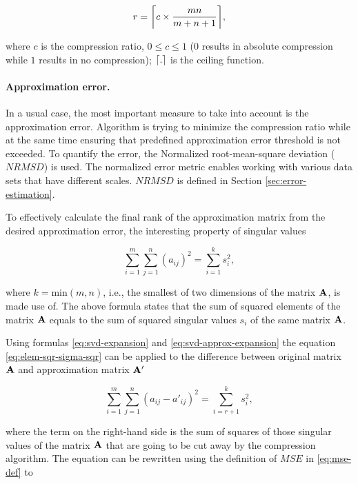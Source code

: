 \begin{equation}
r=\ceil*{c \times \frac{m n}{m+n+1}},
\label{eq:rank-from-comp-ratio}
\end{equation}

\noindent
where $c$ is the compression ratio, $0 \leq c \leq 1$ ($0$ results in absolute compression while $1$ results in no compression); $\ceil*{.}$ is the ceiling function.

\paragraph{Approximation error.}
In a usual case, the most important measure to take into account is the approximation error. Algorithm is trying to minimize the compression ratio while at the same time ensuring that predefined approximation error threshold is not exceeded. To quantify the error, the Normalized root-mean-square deviation ($\mathit{NRMSD}$) is used. The normalized error metric enables working with various data sets that have different scales. $\mathit{NRMSD}$ is defined in Section \ref{sec:error-estimation}.

To effectively calculate the final rank of the approximation matrix from the desired approximation error, the interesting property of singular values

\begin{equation}
\sum_{i=1}^{m} \sum_{j=1}^{n} (a_{ij})^{2} = \sum_{i=1}^{k}{s_{i}^{2}},
\label{eq:elem-sqr-sigma-sqr}
\end{equation}

\noindent
where $k=\mathrm{min}(m, n)$, i.e., the smallest of two dimensions of the matrix $\mtrx{A}$, is made use of. The above formula states that the sum of squared elements of the matrix $\mtrx{A}$ equals to the sum of squared singular values $s_{i}$ of the same matrix $\mtrx{A}$.

Using formulas \eqref{eq:svd-expansion} and \eqref{eq:svd-approx-expansion} the equation \eqref{eq:elem-sqr-sigma-sqr} can be applied to the difference between original matrix $\mtrx{A}$ and approximation matrix $\mtrx{A'}$

\begin{equation}
\sum_{i=1}^{m} \sum_{j=1}^{n} (a_{ij} - a'_{ij})^{2} = \sum_{i=r+1}^{k}{s_{i}^{2}},
\end{equation}

\noindent
where the term on the right-hand side is the sum of squares of those singular values of the matrix $\mtrx{A}$ that are going to be cut away by the compression algorithm. The equation can be rewritten using the definition of $\mathit{MSE}$ in \eqref{eq:mse-def} to

